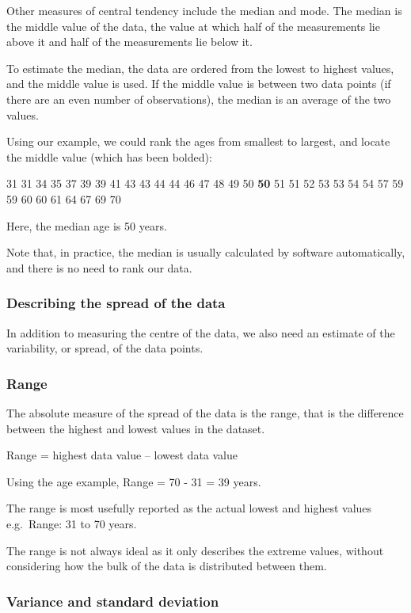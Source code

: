 \documentclass[
  a4paper,
]{memoir}
\begin{document}
Other measures of central tendency include the median and mode. The
median is the middle value of the data, the value at which half of the
measurements lie above it and half of the measurements lie below it.

To estimate the median, the data are ordered from the lowest to highest
values, and the middle value is used. If the middle value is between two
data points (if there are an even number of observations), the median is
an average of the two values.

Using our example, we could rank the ages from smallest to largest, and
locate the middle value (which has been bolded):

31 31 34 35 37 39 39 41 43 43 44 44 46 47 48 49 50 \textbf{50} 51 51 52
53 53 54 54 57 59 59 60 60 61 64 67 69 70

Here, the median age is 50 years.

Note that, in practice, the median is usually calculated by software
automatically, and there is no need to rank our data.

\hypertarget{describing-the-spread-of-the-data}{%
\subsubsection{Describing the spread of the
data}\label{describing-the-spread-of-the-data}}

In addition to measuring the centre of the data, we also need an
estimate of the variability, or spread, of the data points.

\hypertarget{range}{%
\subsubsection{Range}\label{range}}

The absolute measure of the spread of the data is the range, that is the
difference between the highest and lowest values in the dataset.

Range = highest data value -- lowest data value

Using the age example, Range = 70 - 31 = 39 years.

The range is most usefully reported as the actual lowest and highest
values e.g.~Range: 31 to 70 years.

The range is not always ideal as it only describes the extreme values,
without considering how the bulk of the data is distributed between
them.

\hypertarget{variance-and-standard-deviation}{%
\subsubsection{Variance and standard
deviation}\label{variance-and-standard-deviation}}
\end{document}
